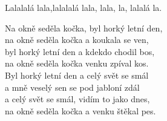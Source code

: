 \nv{}Lalalalá \mm lala,\mm {}lalalalá lala, lala, la, lalalá la. 
\vnv

\nv Na okně seděla kočka, byl horký letní den,\\
na okně seděla kočka a koukala se ven,\\
byl horký letní den a kdekdo chodil bos,\\
na okně seděla kočka venku zpí\sm val \nc{}kos.\\
Byl horký letní den a celý svět se smál\\
a mně veselý sen se pod jabloní zdál\\
a celý svět se smál, vidím to jako dnes,\\
na okně seděla kočka a venku štěkal pes.
\newpage
